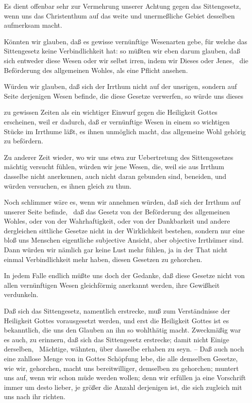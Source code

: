 \begin{aufza}
\item Es dient offenbar sehr zur Vermehrung unserer Achtung gegen das Sittengesetz, wenn uns das Christenthum auf das weite und unermeßliche Gebiet desselben aufmerksam macht.
\item Könnten wir glauben, daß es gewisse vernünftige Wesenarten gebe, für welche das Sittengesetz keine Verbindlichkeit hat: so müßten wir eben darum glauben, daß sich entweder diese Wesen oder wir selbst irren, indem wir Dieses oder Jenes, \zB\  die Beförderung des allgemeinen Wohles, als eine Pflicht ansehen.
\begin{aufzb}
\item Würden wir glauben, daß sich der Irrthum nicht auf der unsrigen, sondern auf Seite derjenigen Wesen befinde, die diese Gesetze verwerfen, so würde uns dieses
\begin{aufzc}
\item zu gewissen Zeiten als ein wichtiger Einwurf gegen die Heiligkeit Gottes erscheinen, weil er dadurch, daß er vernünftige Wesen in einem so wichtigen Stücke im Irrthume läßt, es ihnen unmöglich macht, das allgemeine Wohl gehörig zu befördern.
\item Zu anderer Zeit wieder, wo wir uns etwa zur Uebertretung des Sittengesetzes mächtig versucht fühlen, würden wir jene Wesen, die, weil sie aus Irrthum dasselbe nicht anerkennen, auch nicht daran gebunden sind, beneiden, und würden versuchen, es ihnen gleich zu thun.
\end{aufzc}
\item Noch schlimmer wäre es, wenn wir annehmen würden, daß sich der Irrthum auf unserer Seite befinde, \dh\  daß das Gesetz von der Beförderung des allgemeinen Wohles, oder von der Wahrhaftigkeit, oder von der Dankbarkeit und andere dergleichen sittliche Gesetze nicht in der Wirklichkeit bestehen, sondern nur eine bloß uns Menschen eigentliche subjective Ansicht, aber objective Irrthümer sind. Dann würden wir nämlich gar keine Lust mehr fühlen, ja in der That nicht einmal Verbindlichkeit mehr haben, diesen Gesetzen zu gehorchen.~
\item In jedem Falle endlich müßte uns doch der Gedanke, daß diese Gesetze nicht von allen vernünftigen Wesen gleichförmig anerkannt werden, ihre Gewißheit verdunkeln.
\end{aufzb}
\item Daß sich das Sittengesetz, namentlich  erstrecke, muß zum Verständnisse der Heiligkeit Gottes vorausgesetzt werden, und erst die Heiligkeit Gottes ist es bekanntlich, die uns den Glauben an ihn so wohlthätig macht. Zweckmäßig war es auch, zu erinnern, daß sich das Sittengesetz  erstrecke; damit nicht Einige derselben, \zB\  Mächtige, wähnten, über dasselbe erhaben zu seyn. -- Daß auch noch eine zahllose Menge von  in Gottes Schöpfung lebe, die alle demselben Gesetze, wie wir, gehorchen, macht uns bereitwilliger, demselben zu gehorchen; muntert uns auf, wenn wir schon müde werden wollen; denn wir erfüllen ja eine Vorschrift immer um desto lieber, je größer die Anzahl derjenigen ist, die sich zugleich mit uns nach ihr richten.

\end{aufza}
